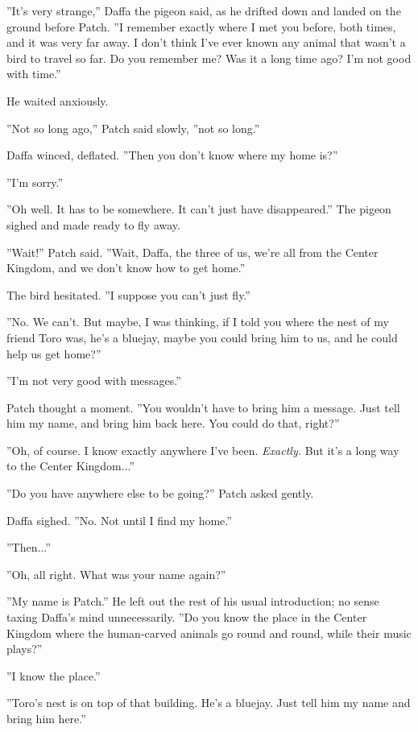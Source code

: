 \documentclass[12pt]{book}
\begin{document}
 ''It's very strange,'' Daffa the pigeon said, as he drifted down and landed on the ground before Patch. ''I remember exactly where I met you before, both times, and it was very far away. I don't think I've ever known any animal that wasn't a bird to travel so far. Do you remember me? Was it a long time ago? I'm not good with time.''\par
 He waited anxiously.\par
 ''Not so long ago,'' Patch said slowly, ''not so long.''\par
 Daffa winced, deflated. ''Then you don't know where my home is?''\par
 ''I'm sorry.''\par
 ''Oh well. It has to be somewhere. It can't just have disappeared.'' The pigeon sighed and made ready to fly away.\par
 ''Wait!'' Patch said. ''Wait, Daffa, the three of us, we're all from the Center Kingdom, and we don't know how to get home.''\par
 The bird hesitated. ''I suppose you can't just fly.''\par
 ''No. We can't. But maybe, I was thinking, if I told you where the nest of my friend Toro was, he's a bluejay, maybe you could bring him to us, and he could help us get home?''\par
 ''I'm not very good with messages.''\par
 Patch thought a moment. ''You wouldn't have to bring him a message. Just tell him my name, and bring him back here. You could do that, right?''\par
 ''Oh, of course. I know exactly anywhere I've been. {\it Exactly.} But it's a long way to the Center Kingdom...''\par
 ''Do you have anywhere else to be going?'' Patch asked gently.\par
 Daffa sighed. ''No. Not until I find my home.''\par
 ''Then...''\par
 ''Oh, all right. What was your name again?''\par
 ''My name is Patch.'' He left out the rest of his usual introduction; no sense taxing Daffa's mind unnecessarily. ''Do you know the place in the Center Kingdom where the human-carved animals go round and round, while their music plays?''\par
 ''I know the place.''\par
''Toro's nest is on top of that building. He's a bluejay. Just tell him my name and bring him here.''\par
\end{document}
